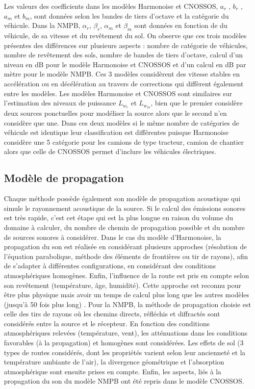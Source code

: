 Les valeurs des coefficients dans les modèles Harmonoise et CNOSSOS, $a_r$ ,  $b_r$ ,  $a_m$  et $b_m$,   sont données selon les bandes de tiers d'octave et la catégorie du véhicule. Dans la NMPB, $\alpha_r$, $\beta_r$, $\alpha_m$ et $\beta_m$ sont données en fonction de du véhicule, de sa vitesse et du revêtement du sol.
On observe que ces trois modèles présentes des différences sur plusieurs aspects : nombre de catégorie de véhicules, nombre de revêtement des sols, nombre de bandes de tiers d'octave, calcul d'un niveau en dB pour le modèle Harmonoise et CNOSSOS et d'un calcul en dB par mètre pour le modèle NMPB. Ces 3 modèles considèrent des vitesse stables en accélération ou en décélération au travers de corrections qui diffèrent également entre les modèles. Les modèles Harmonoise et CNOSSOS sont similaires sur l'estimation des niveaux de puissance $L_{w_r}$ et $L_{w_m}$, bien que le premier considère deux sources ponctuelles pour modéliser la source alors que le second n'en considère que une. Dans ces deux modèles si le même nombre de catégories de véhicule est identique leur classification est différentes puisque Harmonoise considère une 5\ieme{} catégorie pour les camions de type tracteur, camion de chantier alors que celle de CNOSSOS permet d'inclure les véhicules électriques.

\subsection{Modèle de propagation}\label{part:modele_propa}
Chaque méthode possède également son modèle de propagation acoustique qui simule le rayonnement acoustique de la source. Si le calcul des émissions sonores est très rapide, c'est cet étape qui est la plus longue en raison du volume du domaine à calculer, du nombre de chemin de propagation possible et du nombre de sources sonores à considérer.
Dans le cas du modèle d'Harmonoise, la propagation du son est réalisée en considérant plusieurs approches (résolution de l'équation parabolique, méthode des éléments de frontières ou tir de rayons), afin de s'adapter à différentes configurations, en considérant des conditions atmosphériques homogènes. Enfin, l'influence de la route est pris en compte selon son revêtement (température, âge, humidité). Cette approche est reconnu pour être plus \og physique \fg{} mais avoir un temps de calcul plus long que les autres modèles (jusqu'à 50 fois plus long) \cite{probst2011comparison}. Pour la NMPB, la méthode de propagation choisie est celle des tirs de rayons où les chemins directs, réfléchis et diffractés sont considérés entre la source et le récepteur. En fonction des conditions atmosphériques relevées (température, vent), les atténuations dans les conditions favorables (à la propagation) et homogènes sont considérées. Les effets de sol (3 types de routes considérés, dont les propriétés varient selon leur ancienneté et la température ambiante de l'air), la divergence géométrique et l'absorption atmosphérique sont ensuite prises en compte.
Enfin, les aspects, liés à la propagation du son du modèle NMPB ont été repris dans le modèle CNOSSOS. 

